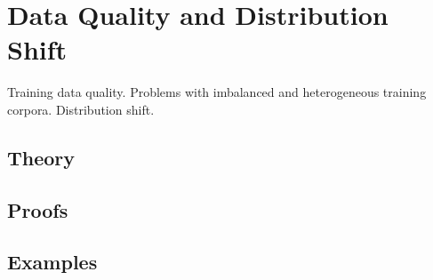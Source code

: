 
\section{Data Quality and Distribution Shift}
\label{sec:2.5.07-data-quality-shift}

\begin{ticket}
Training data quality. Problems with imbalanced and heterogeneous training corpora. Distribution shift.
\end{ticket}

\subsection*{Theory}

\subsection*{Proofs}

\subsection*{Examples}
